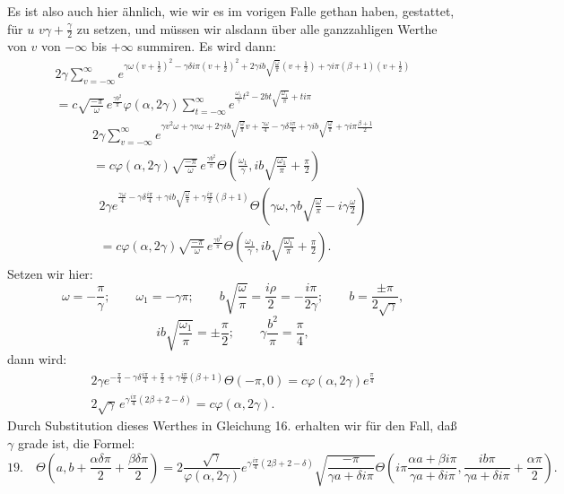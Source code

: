 \documentclass[10pt]{article}
\newcommand{\sourceanchor}[1]{\hypertarget{source-#1}{}}
\begin{document}
Es ist also auch hier ähnlich, wie wir es im vorigen Falle gethan haben, gestattet, für \(u\)
\(v\gamma+\frac{\gamma}{2}\) zu setzen, und müssen wir alsdann über alle ganzzahligen Werthe von \(v\) von \(-\infty\) bis \(+\infty\) summiren. Es wird dann:
\begin{multline*}
2\gamma\sum_{v=-\infty}^{\infty}
 e^{\gamma\omega\left(v+\frac12\right)^{2}-\gamma\delta i\pi\left(v+\frac12\right)^{2}
 +2\gamma ib\sqrt{\frac{\omega}{\pi}}\left(v+\frac12\right)+\gamma i\pi(\beta+1)\left(v+\frac12\right)}\\
=c\sqrt{\frac{-\pi}{\omega}}\,e^{\frac{\gamma b^{2}}{\pi}}\varphi(\alpha,2\gamma)
\sum_{t=-\infty}^{\infty}e^{\frac{\omega_{1}}{\gamma}t^{2}-2bt\sqrt{\frac{\omega_{1}}{\pi}}+ti\pi}
\end{multline*}
\begin{multline*}
2\gamma\sum_{v=-\infty}^{\infty}
 e^{\gamma v^{2}\omega+\gamma v\omega+2\gamma ib\sqrt{\frac{\omega}{\pi}}v+\frac{\gamma\omega}{4}
 -\gamma\delta\frac{i\pi}{4}+\gamma ib\sqrt{\frac{\omega}{\pi}}
 +\gamma i\pi\frac{\beta+1}{2}}\\
=c\varphi(\alpha,2\gamma)\sqrt{\frac{-\pi}{\omega}}\,e^{\frac{\gamma b^{2}}{\pi}}
\Theta\!\left(\frac{\omega_{1}}{\gamma}, ib\sqrt{\frac{\omega_{1}}{\pi}}+\frac{\pi}{2}\right)
\end{multline*}
\sourceanchor{PA16}
\begin{multline*}
2\gamma e^{\frac{\gamma\omega}{4}-\gamma\delta\frac{i\pi}{4}+\gamma ib\sqrt{\frac{\omega}{\pi}}+\gamma\frac{i\pi}{2}(\beta+1)}
\Theta\!\left(\gamma\omega,\gamma b\sqrt{\frac{\omega}{\pi}}-i\gamma\frac{\omega}{2}\right)\\
=c\varphi(\alpha,2\gamma)\sqrt{\frac{-\pi}{\omega}}\,e^{\frac{\gamma b^{2}}{\pi}}
\Theta\!\left(\frac{\omega_{1}}{\gamma},ib\sqrt{\frac{\omega_{1}}{\pi}}+\frac{\pi}{2}\right).
\end{multline*}
Setzen wir hier:
\[
\omega=-\frac{\pi}{\gamma};\qquad \omega_{1}=-\gamma\pi;
\qquad b\sqrt{\frac{\omega}{\pi}}=\frac{i\rho}{2}=-\frac{i\pi}{2\gamma};
\qquad b=\frac{\pm\pi}{2\sqrt{\gamma}},
\]
\[
ib\sqrt{\frac{\omega_{1}}{\pi}}=\pm\frac{\pi}{2};
\qquad \gamma\frac{b^{2}}{\pi}=\frac{\pi}{4},
\]
dann wird:
\begin{multline*}
2\gamma e^{-\frac{\pi}{4}-\gamma\delta\frac{i\pi}{4}+\frac{\pi}{2}+\gamma\frac{i\pi}{2}(\beta+1)}
\Theta(-\pi,0)=c\varphi(\alpha,2\gamma)e^{\frac{\pi}{4}}\\
2\sqrt{\gamma}\,e^{\gamma\frac{i\pi}{4}(2\beta+2-\delta)}=c\varphi(\alpha,2\gamma).
\end{multline*}
Durch Substitution dieses Werthes in Gleichung 16. erhalten wir für den Fall, daß \(\gamma\) grade ist, die Formel:
\begin{equation*}
19.\quad
\Theta\!\left(a,b+\frac{\alpha\delta\pi}{2}+\frac{\beta\delta\pi}{2}\right)
=2\frac{\sqrt{\gamma}}{\varphi(\alpha,2\gamma)}
 e^{\gamma\frac{i\pi}{4}(2\beta+2-\delta)}
\sqrt{\frac{-\pi}{\gamma a+\delta i\pi}}
\Theta\!\left(i\pi\frac{\alpha a+\beta i\pi}{\gamma a+\delta i\pi},
\frac{ib\pi}{\gamma a+\delta i\pi}+\frac{\alpha\pi}{2}\right).
\end{equation*}
\end{document}
